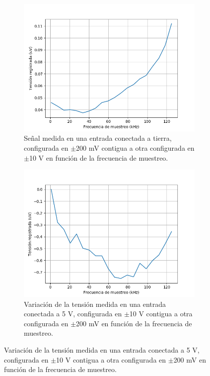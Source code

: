 \documentclass[a4paper,11pt]{article}
\begin{document}
\begin{figure}[!ht]
\begin{figure}[!ht]
\centering
\includegraphics[width=\textwidth]{figs/settling0V.png}
\caption{Señal medida en una entrada conectada a tierra, configurada en $\pm$200 mV contigua a otra configurada en $\pm$10 V en función de la frecuencia de muestreo.}
\label{fig:settling1}
\end{figure}

\begin{figure}[!ht]
\centering
\includegraphics[width=\textwidth]{figs/settling5V.png}
\caption{Variación de la tensión medida en una entrada conectada a 5 V, configurada en $\pm$10 V contigua a otra configurada en $\pm$200 mV en función de la frecuencia de muestreo.}
\label{fig:settling2}
\end{figure}


\end{figure}
\end{document}
